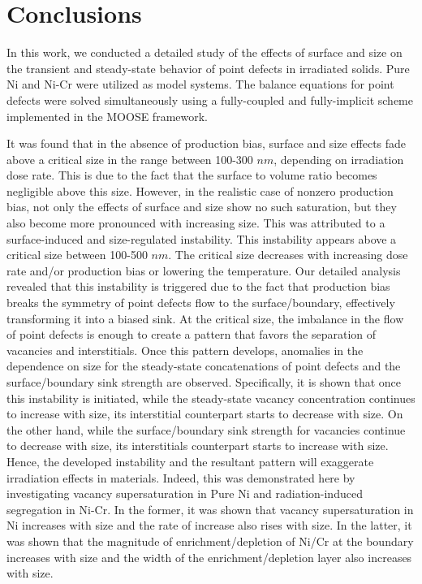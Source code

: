 \documentclass[utf8]{frontiersSCNS} %
\begin{document}
\clearpage
\section{Conclusions}

In this work, we conducted a detailed study of the effects of surface and size on the transient and steady-state behavior of point defects in irradiated solids. Pure Ni and Ni-Cr were utilized as model systems. The balance equations for point defects were solved simultaneously using a fully-coupled and fully-implicit scheme implemented in the MOOSE framework.    

It was found that in the absence of production bias, surface and size effects fade above a critical size in the range between 100-300 $nm$, depending on irradiation dose rate. This is due to the fact that the surface to volume ratio becomes negligible above this size. However, in the realistic case of nonzero production bias, not only the effects of surface and size show no such saturation, but they also become more pronounced with increasing size. This was attributed to a surface-induced and size-regulated instability. This instability appears above a critical size between 100-500 $nm$. The critical size decreases with increasing dose rate and/or production bias or lowering the temperature. Our detailed analysis revealed that this instability is triggered due to the fact that production bias breaks the symmetry of point defects flow to the surface/boundary, effectively transforming it into a biased sink. At the critical size, the imbalance in the flow of point defects is enough to create a pattern that favors the separation of vacancies and interstitials. Once this pattern develops, anomalies in the dependence on size for the steady-state concatenations of point defects and the surface/boundary sink strength are observed. Specifically, it is shown that once this instability is initiated, while the steady-state vacancy concentration continues to increase with size, its interstitial counterpart starts to decrease with size. On the other hand, while the surface/boundary sink strength for vacancies continue to decrease with size, its interstitials counterpart starts to increase with size. Hence, the developed instability and the resultant pattern will exaggerate irradiation effects in materials. Indeed, this was demonstrated here by investigating vacancy supersaturation in Pure Ni and radiation-induced segregation in Ni-Cr. In the former, it was shown that vacancy supersaturation in Ni increases with size and the rate of increase also rises with size. In the latter, it was shown that the magnitude of enrichment/depletion of Ni/Cr at the boundary increases with size and the width of the enrichment/depletion layer also increases with size.
\end{document}
